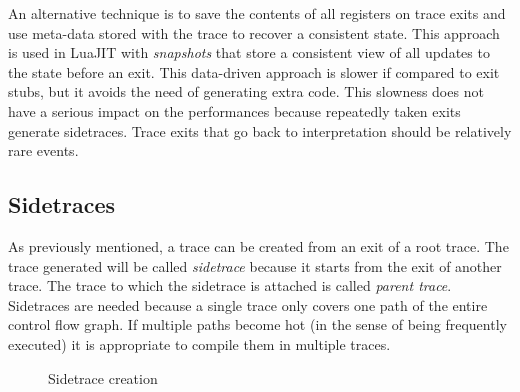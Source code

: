 An alternative technique is to save the contents of all registers on trace exits and use meta-data stored with the trace to recover a consistent state. This approach is used in LuaJIT \cite{pall2012luajit} with \textit{snapshots} that store a consistent view of all updates to the state before an exit. This data-driven approach is slower if compared to exit stubs, but it avoids the need of generating extra code. This slowness does not have a serious impact on the performances because repeatedly taken exits generate sidetraces. Trace exits that go back to interpretation should be relatively rare events.

\subsection{Sidetraces}
\label{sec:sidetrace}
As previously mentioned, a trace can be created from an exit of a root trace. The trace generated will be called \textit{sidetrace} because it starts from the exit of another trace. The trace to which the sidetrace is attached is called \textit{parent trace}. Sidetraces are needed because a single trace only covers one path of the entire control flow graph. If multiple paths become hot (in the sense of being frequently executed) it is appropriate to compile them in multiple traces. 

\begin{figure}[H]
    \hspace*{2.2cm}
    \vspace*{0cm}
    \caption{Sidetrace creation}
    \label{fig:diagram-hotsidetrace}
\end{figure}

